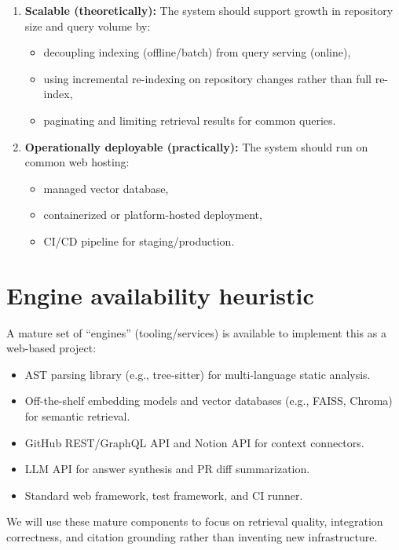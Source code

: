 \documentclass[11pt,a4paper]{article}
\begin{document}
\begin{enumerate}[leftmargin=0.7cm]
    \item \textbf{Scalable (theoretically):} The system should support growth in repository size and query volume by:
    \begin{itemize}[leftmargin=0.7cm]
        \item decoupling indexing (offline/batch) from query serving (online),
        \item using incremental re-indexing on repository changes rather than full re-index,
        \item paginating and limiting retrieval results for common queries.
    \end{itemize}
    
    \item \textbf{Operationally deployable (practically):} The system should run on common web hosting:
    \begin{itemize}[leftmargin=0.7cm]
        \item managed vector database,
        \item containerized or platform-hosted deployment,
        \item CI/CD pipeline for staging/production.
    \end{itemize}
\end{enumerate}

\section{Engine availability heuristic}
A mature set of ``engines'' (tooling/services) is available to implement this as a web-based project:
\begin{itemize}[leftmargin=0.7cm]
    \item AST parsing library (e.g., tree-sitter) for multi-language static analysis.
    \item Off-the-shelf embedding models and vector databases (e.g., FAISS, Chroma) for semantic retrieval.
    \item GitHub REST/GraphQL API and Notion API for context connectors.
    \item LLM API for answer synthesis and PR diff summarization.
    \item Standard web framework, test framework, and CI runner.
\end{itemize}
We will use these mature components to focus on retrieval quality, integration correctness, and citation grounding rather than inventing new infrastructure.
\end{document}
